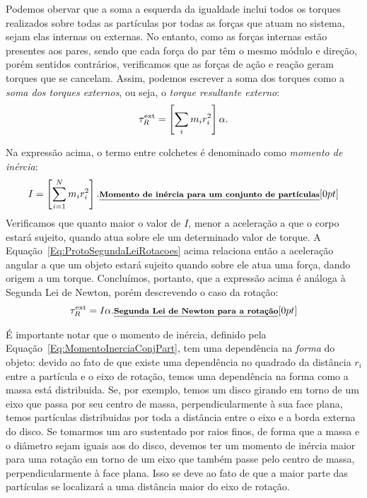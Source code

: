 %
%
Podemos obervar que a soma a esquerda da igualdade inclui todos os torques realizados sobre todas as partículas por todas as forças que atuam no sistema, sejam elas internas ou externas. No entanto, como as forças internas estão presentes aos pares, sendo que cada força do par têm o mesmo módulo e direção, porém sentidos contrários, verificamos que as forças de ação e reação geram torques que se cancelam. Assim, podemos escrever a soma dos torques como a \emph{soma dos torques externos}, ou seja, o \emph{torque resultante externo}:
\begin{equation}\label{Eq:ProtoSegundaLeiRotacoes}
    \tau_R^{\rm{ext}} = \left[\sum_{i} m_i r_i^2\right] \alpha.
\end{equation}
% 

Na expressão acima, o termo entre colchetes é denominado como \emph{momento de inércia}:
\begin{equation}\label{Eq:MomentoInerciaConjPart}
    I = \left[\sum_{i = 1}^N m_i r_i^2\right]. \relax{\footnotesize\emph{\textbf{Momento de inércia para um conjunto de partículas}}}[0pt]
\end{equation}
%
Verificamos que quanto maior o valor de $I$, menor a aceleração a que o corpo estará sujeito, quando atua sobre ele um determinado valor de torque. A Equação~\eqref{Eq:ProtoSegundaLeiRotacoes} acima relaciona então a aceleração angular a que um objeto estará sujeito quando sobre ele atua uma força, dando origem a um torque. Concluímos, portanto, que a expressão acima é análoga à Segunda Lei de Newton, porém descrevendo o caso da rotação:
\begin{equation}
    \tau_R^{\rm{ext}} = I \alpha. \relax{\footnotesize\emph{\textbf{Segunda Lei de Newton para a rotação}}}[0pt]
\end{equation}

É importante notar que o momento de inércia, definido pela Equação~\eqref{Eq:MomentoInerciaConjPart}, tem uma dependência na \emph{forma} do objeto: devido ao fato de que existe uma dependência no quadrado da distância $r_i$ entre a partícula e o eixo de rotação, temos uma dependência na forma como a massa está distribuida. Se, por exemplo, temos um disco girando em torno de um eixo que passa por seu centro de massa, perpendicularmente à sua face plana, temos partículas distribuidas por toda a distância entre o eixo e a borda externa do disco. Se tomarmos um aro sustentado por raios finos, de forma que a massa e o diâmetro sejam iguais aos do disco, devemos ter um momento de inércia maior para uma rotação em torno de um eixo que também passe pelo centro de massa, perpendicularmente à face plana. Isso se deve ao fato de que a maior parte das partículas se localizará a uma distância maior do eixo de rotação.

